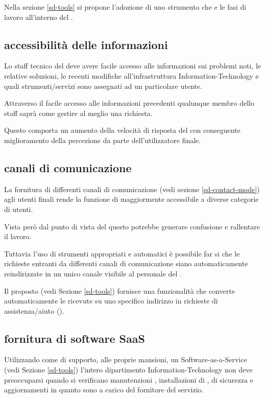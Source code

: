 Nella sezione \ref{sd-tools} si propone l'adozione di uno strumento  che  e  le fasi di lavoro all'interno del .

\subsection[Accessibilità delle informazioni]{accessibilità delle informazioni}
\label{sd-users-experience-accessibility}
Lo staff tecnico del  deve avere facile accesso alle informazioni sui problemi noti, le relative soluzioni, le recenti modifiche all'infrastruttura \acs{Information-Technology} e quali strumenti/servizi sono assegnati ad un particolare utente.

Attraverso il facile accesso alle informazioni precedenti qualunque membro dello staff saprà come gestire al meglio una richiesta.

Questo comporta un aumento della velocità di risposta del  con conseguente miglioramento della percezione da parte dell'utilizzatore finale.

\subsection[Canali di comunicazione]{canali di comunicazione}
\label{sd-users-experience-communication}
La fornitura di differenti canali di comunicazione (vedi sezione \ref{sd-contact-mode}) agli utenti finali rende la funzione di  maggiormente accessibile a diverse categorie di utenti.

Vista però dal punto di vista del  questo potrebbe generare confusione e rallentare il lavoro.

Tuttavia l'uso di strumenti appropriati e automatici è possibile far si che le richieste entranti da differenti canali di comunicazione siano automaticamente reindirizzate in un unico canale visibile al personale del .

Il  proposto (vedi Sezione \ref{sd-tools}) fornisce una funzionalità che converte automaticamente le  ricevute su uno specifico indirizzo in richieste di assistenza/aiuto ().

\subsection[Fornitura di software SaaS]{fornitura di software SaaS}
\label{sd-users-experience-saas}
Utilizzando come  di supporto, alle proprie mansioni, un \ac{Software-as-a-Service} (vedi Sezione \ref{sd-tools}) l'intero dipartimento \acs{Information-Technology} non deve preoccuparsi quando si verificano manutenzioni , installazioni di ,  di sicurezza e aggiornamenti  in quanto sono a carico del fornitore del servizio.


